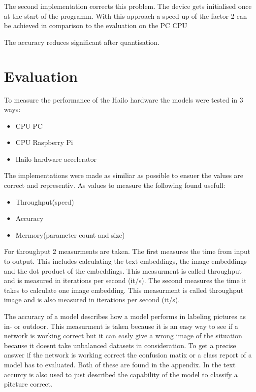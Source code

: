 The second implementation corrects this problem.
The device gets initialised once at the start of the programm.
With this approach a speed up of the factor 2 can be achieved in comparison to the evaluation on the PC CPU



The accuracy reduces significant after quantisation. 

\section{Evaluation}

To measure the performance of the Hailo hardware the models were tested in 3 ways:
\begin{itemize}
    \item CPU PC
    \item CPU Raspberry Pi
    \item Hailo hardware accelerator
\end{itemize}
The implementations were made as similiar as possible to ensuer the values are correct and representiv. 
As values to measure the following found usefull:
\begin{itemize}
    \item Throughput(speed)
    \item Accuracy
    \item Mermory(parameter count and size) 
\end{itemize}

For throughput 2 measurments are taken.
The first measures the time from input to output.
This includes calculating the text embeddings, the image embeddings and the dot product of the embeddings.
This measurment is called throughput and is measured in iterations per second (it/s).
The second measures the time it takes to calculate one image embedding.
This measurment is called throughput image and is also measured in iterations per second (it/s).

The accuracy of a model describes how a model performs in labeling pictures as in- or outdoor.
This measurment is taken because it is an easy way to see if a network is working correct but it can easly give a wrong image of the situation because it doesnt take unbalanced datasets in consideration.
To get a precise answer if the network is working correct the confusion matix or a class report of a model has to evaluated.
Both of these are found in the appendix.
In the text accurcy is also used to just described the capability of the model to classify a pitcture correct.

